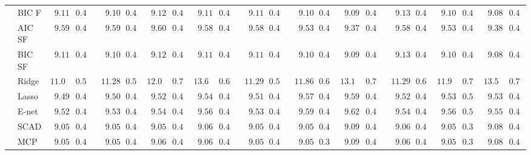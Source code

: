 \begin{tabular}{p{0.2cm}p{1cm}|p{0.6cm}p{0.6cm}|p{0.6cm}p{0.6cm}p{0.6cm}p{0.6cm}p{0.6cm}p{0.6cm}|p{0.6cm}p{0.6cm}p{0.6cm}p{0.6cm}p{0.6cm}p{0.6cm}|p{0.6cm}p{0.6cm}p{0.6cm}p{0.6cm}p{0.6cm}p{0.6cm}}
 & BIC F  & $\phantom{0}9.11$ & $0.41$ & $\phantom{00}9.10$ & $0.42$ & $\phantom{0}9.12$ & $0.41$ & $\phantom{0}9.11$ & $0.41$ & $\phantom{00}9.11$ & $0.41$ & $\phantom{00}9.10$ & $0.41$ & $\phantom{0}9.09$ & $0.41$ & $\phantom{00}9.13$ & $0.41$ & $\phantom{0}9.10$ & $0.41$ & $\phantom{0}9.08$ & $0.41$ \\
 & AIC SF  & $\phantom{0}9.59$ & $0.46$ & $\phantom{00}9.59$ & $0.42$ & $\phantom{0}9.60$ & $0.45$ & $\phantom{0}9.58$ & $0.45$ & $\phantom{00}9.58$ & $0.45$ & $\phantom{00}9.53$ & $0.45$ & $\phantom{0}9.37$ & $0.45$ & $\phantom{00}9.58$ & $0.44$ & $\phantom{0}9.53$ & $0.46$ & $\phantom{0}9.38$ & $0.46$ \\
 & BIC SF  & $\phantom{0}9.11$ & $0.41$ & $\phantom{00}9.10$ & $0.42$ & $\phantom{0}9.12$ & $0.41$ & $\phantom{0}9.11$ & $0.41$ & $\phantom{00}9.11$ & $0.41$ & $\phantom{00}9.10$ & $0.41$ & $\phantom{0}9.09$ & $0.41$ & $\phantom{00}9.13$ & $0.41$ & $\phantom{0}9.10$ & $0.41$ & $\phantom{0}9.08$ & $0.41$ \\
 & Ridge  & $11.07$ & $0.54$ & $\phantom{0}11.28$ & $0.56$ & $12.00$ & $0.71$ & $13.67$ & $0.66$ & $\phantom{0}11.29$ & $0.54$ & $\phantom{0}11.86$ & $0.67$ & $13.13$ & $0.71$ & $\phantom{0}11.29$ & $0.68$ & $11.96$ & $0.71$ & $13.56$ & $0.73$ \\
 & Lasso  & $\phantom{0}9.49$ & $0.45$ & $\phantom{00}9.50$ & $0.46$ & $\phantom{0}9.52$ & $0.48$ & $\phantom{0}9.54$ & $0.42$ & $\phantom{00}9.51$ & $0.44$ & $\phantom{00}9.57$ & $0.45$ & $\phantom{0}9.59$ & $0.44$ & $\phantom{00}9.52$ & $0.48$ & $\phantom{0}9.53$ & $0.50$ & $\phantom{0}9.53$ & $0.44$ \\
 & E-net  & $\phantom{0}9.52$ & $0.46$ & $\phantom{00}9.53$ & $0.46$ & $\phantom{0}9.54$ & $0.49$ & $\phantom{0}9.56$ & $0.42$ & $\phantom{00}9.53$ & $0.45$ & $\phantom{00}9.59$ & $0.46$ & $\phantom{0}9.62$ & $0.44$ & $\phantom{00}9.54$ & $0.49$ & $\phantom{0}9.56$ & $0.50$ & $\phantom{0}9.55$ & $0.44$ \\
 & SCAD  & $\phantom{0}9.05$ & $0.40$ & $\phantom{00}9.05$ & $0.40$ & $\phantom{0}9.05$ & $0.40$ & $\phantom{0}9.06$ & $0.40$ & $\phantom{00}9.05$ & $0.41$ & $\phantom{00}9.05$ & $0.40$ & $\phantom{0}9.09$ & $0.41$ & $\phantom{00}9.06$ & $0.41$ & $\phantom{0}9.05$ & $0.39$ & $\phantom{0}9.08$ & $0.41$ \\
 & MCP  & $\phantom{0}9.05$ & $0.40$ & $\phantom{00}9.05$ & $0.40$ & $\phantom{0}9.06$ & $0.40$ & $\phantom{0}9.06$ & $0.40$ & $\phantom{00}9.05$ & $0.41$ & $\phantom{00}9.05$ & $0.39$ & $\phantom{0}9.09$ & $0.41$ & $\phantom{00}9.06$ & $0.41$ & $\phantom{0}9.05$ & $0.39$ & $\phantom{0}9.08$ & $0.41$ \\

\end{tabular}
